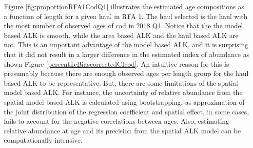 \documentclass[a4paper 12pt]{article}
\numberwithin{equation}{section}
\begin{document}
Figure \ref{fig:proportionRFA1CodQ1} illustrates the estimated age compositions as a function of length for a given haul in RFA 1. The haul selected is the haul with the most number of observed ages of cod in 2018 Q1. Notice that the the model based ALK is smooth, while the area based ALK and the haul based ALK are not. This is an important advantage of the model based ALK, and it is surprising that it did not result in a larger difference in the estimated index of abundance as shown Figure \ref{percentileBiascorrectedCIcod}. An intuitive reason for this is presumably because there are enough observed ages per length group for the haul based ALK to be representative. But, there are some limitations of the spatial model based ALK. For instance, the uncertainty of relative abundance from the spatial model based ALK is calculated using bootstrapping, as approximation of the joint distribution of the regression coefficient and spatial effect, in some cases, fails to account for the  negative correlations between ages. Also, estimating relative abundance at age and its precision from the spatial ALK model can be computationally intensive. 
\end{document}
